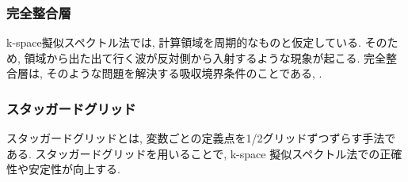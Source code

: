 \subsubsection{完全整合層}
k-space擬似スペクトル法では, 計算領域を周期的なものと仮定している. そのため, 領域から出た出て行く波が反対側から入射するような現象が起こる. 完全整合層は, そのような問題を解決する吸収境界条件のことである\cite{hayashisan[38]}, \cite{hayashisan[39]}. 
\subsubsection{スタッガードグリッド}
スタッガードグリッドとは, 変数ごとの定義点を1/2グリッドずつずらす手法である. スタッガードグリッドを用いることで, k-space 擬似スペクトル法での正確性や安定性が向上する\cite{}.